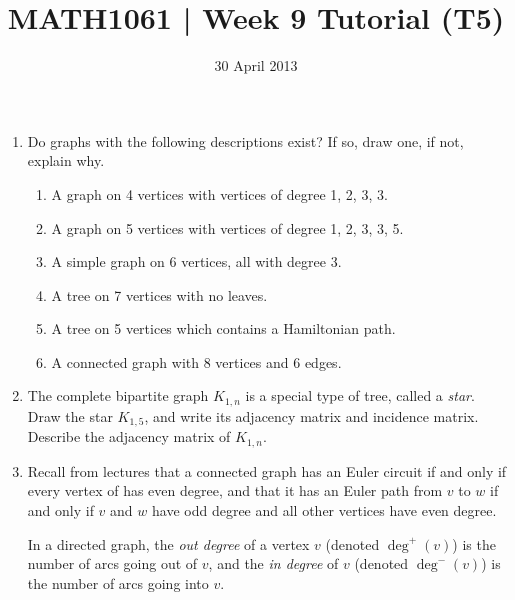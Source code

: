 \documentclass[a4paper,12pt]{article}
\begin{document}
\pagestyle{myheadings}

\title{MATH1061 | Week 9 Tutorial (T5)}
\date{30 April 2013}
\maketitle

\begin{enumerate}
\item
Do graphs with the following descriptions exist? If so, draw one, if not,
explain why.
    \begin{enumerate}
    \item A graph on 4 vertices with vertices of degree 1, 2, 3, 3.
    \item A graph on 5 vertices with vertices of degree 1, 2, 3, 3, 5.
    \item A simple graph on 6 vertices, all with degree 3.
    \item A tree on 7 vertices with no leaves.
    \item A tree on 5 vertices which contains a Hamiltonian path.
    \item A connected graph with 8 vertices and 6 edges.
    \end{enumerate}
\item
The complete bipartite graph $K_{1,n}$ is a special type of tree, called a
{\em star}. Draw the star $K_{1,5}$, and write its adjacency matrix and
incidence matrix. Describe the adjacency matrix of $K_{1,n}$.
\item
Recall from lectures that a connected graph has an Euler circuit if and
only if every vertex of has even degree, and that it has an Euler path from
$v$ to $w$ if and only if $v$ and $w$ have odd degree and all other vertices
have even degree.

In a directed graph, the {\em out degree} of a vertex $v$ (denoted $\deg^+(v)$)
is the number of arcs going out of $v$, and the {\em in degree} of $v$
(denoted $\deg^-(v)$) is the number of arcs going into $v$.


\end{enumerate}
\end{document}

